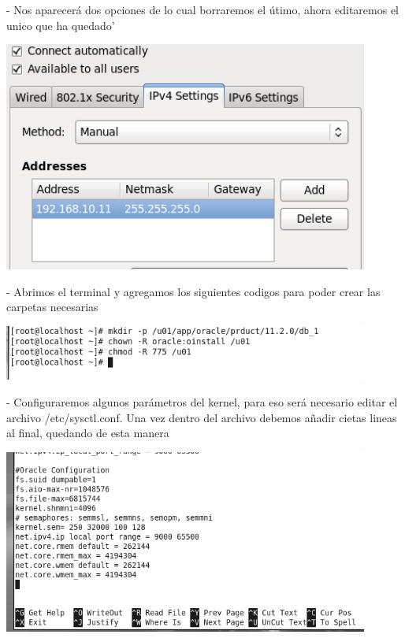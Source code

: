 \documentclass[12pt,letterpaper]{article}
\begin{document}
\begin{itemize}
- Nos aparecerá dos opciones de lo cual borraremos el útimo, ahora editaremos el unico que ha quedado'\\
\end{itemize}

\begin{center}
	\includegraphics[width=12cm]{./Imagenes/18} 
\end{center}

\begin{itemize}
- Abrimos el terminal y agregamos los siguientes codigos para poder crear las carpetas necesarias\\
\end{itemize}

\begin{center}
	\includegraphics[width=12cm]{./Imagenes/19} 
\end{center}

\begin{itemize}
- Configuraremos algunos parámetros del kernel, para eso será necesario editar el archivo
/etc/sysctl.conf. Una vez dentro del archivo debemos añadir cietas lineas al final, quedando de esta manera\\
\end{itemize}

\begin{center}
	\includegraphics[width=12cm]{./Imagenes/20} 
\end{center}
\end{document}
